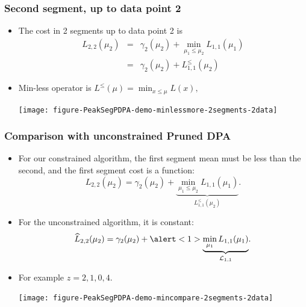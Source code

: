 \documentclass{beamer}
\begin{document}
\begin{frame}[fragile]
  \frametitle{Second segment, up to data point 2}
  \begin{itemize}
  \item The cost in 2 segments up to data point 2 is
\begin{eqnarray*}
  L_{2,2}(\mu_2) 
  &=&  \gamma_2(\mu_2)+\min_{\mu_1 \leq \mu_2} L_{1,1}(\mu_1)\\
  &=& \gamma_2(\mu_2)+L_{1,1}^{\leq}(\mu_2)
\end{eqnarray*}
\item Min-less operator is $L^\leq(\mu) = \min_{x\leq\mu} L(x),$
    \begin{center}
      \texttt{[image: figure-PeakSegPDPA-demo-minlessmore-2segments-2data]}
    \end{center}
\end{itemize}
\end{frame}

\begin{frame}
  \frametitle{Comparison with unconstrained Pruned DPA}
  \begin{itemize}
  \item For our constrained algorithm, the first segment mean must be
    less than the second, and the first segment cost is a function:
    \begin{equation*}
      L_{2,2}(\mu_2) = \gamma_2(\mu_2)+
      \underbrace{\min_{\mu_1 \leq \mu_2} L_{1,1}(\mu_1)}_{L^\leq_{1,1}(\mu_2)}.
    \end{equation*}
  \item For the unconstrained algorithm, it is \alert<1>{constant}:
    \begin{equation*}
      \widehat{L}_{2,2}(\mu_2) = \gamma_2(\mu_2)+
      \alert<1>{\underbrace{\min_{\mu_1} L_{1,1}(\mu_1)}_{\mathcal L_{1,1}}}.
    \end{equation*}
  \item For example $z = 2, 1, 0, 4$.
    \begin{center}
      \texttt{[image: figure-PeakSegPDPA-demo-mincompare-2segments-2data]}
    \end{center}
  \end{itemize}
\end{frame}
\end{document}
